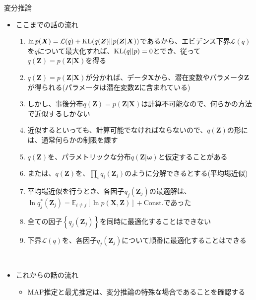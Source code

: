 \documentclass[dvipdfmx,notheorems,t]{beamer}
\begin{document}
\begin{frame}{変分推論}

\begin{itemize}
	\item ここまでの話の流れ
	\begin{enumerate}
		\item $\ln p(\bm{X}) = \mathcal{L}(q) + \operatorname{KL} (q(\bm{Z}) || p(\bm{Z} | \bm{X}))$であるから、\alert{エビデンス下界}$\mathcal{L}(q)$を\color{red}$q$について最大化\normalcolor すれば、$\operatorname{KL} (q || p) = 0$とでき、従って$q(\bm{Z}) = p(\bm{Z} | \bm{X})$を得る
		\newline
		\item $q(\bm{Z}) = p(\bm{Z} | \bm{X})$が分かれば、データ$\bm{X}$から、\color{red}潜在変数やパラメータ$\bm{Z}$が得られる\normalcolor (パラメータは潜在変数$\bm{Z}$に含まれている)
		\newline
		\item しかし、事後分布$q(\bm{Z}) = p(\bm{Z} | \bm{X})$は\alert{計算不可能}なので、何らかの方法で\alert{近似}するしかない
		\newline
		\item 近似するといっても、計算可能でなければならないので、$q(\bm{Z})$の形には、通常\alert{何らかの制限}を課す
		\newline
		\item $q(\bm{Z})$を、\alert{パラメトリックな分布}$q(\bm{Z} | \bm{\omega})$と仮定することがある
		\newline
		\item または、$q(\bm{Z})$を、$\prod_i q_i(\bm{Z}_i)$のように分解できるとする(\alert{平均場近似})
		\newline
		\item \alert{平均場近似}を行うとき、各因子$q_j(\bm{Z}_j)$の最適解は、$\ln q_j^*(\bm{Z}_j) = \mathbb{E}_{i \neq j}[\ln p(\bm{X}, \bm{Z})] + \mathrm{Const.}$であった
		\newline
		\item 全ての因子$\left\{ q_j(\bm{Z}_j) \right\}$を\alert{同時に最適化することはできない}
		\newline
		\item 下界$\mathcal{L}(q)$を、各因子$q_j(\bm{Z}_j)$について\alert{順番に最適化}することはできる
	\end{enumerate} \
	
	\item これからの話の流れ
	\begin{itemize}
		\item MAP推定と最尤推定は、変分推論の\alert{特殊な場合}であることを確認する
	\end{itemize}
\end{itemize}

\end{frame}
\end{document}

